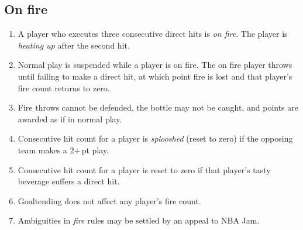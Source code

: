 \documentclass[11pt,letterpaper,twocolumn,english,DIV=calc]{scrartcl}
\begin{document}
\subsection{On fire}
\begin{enumerate}[leftmargin=2.8em, label=\thesubsection.\arabic*]
	\item \label{enu:fire_count} A player who executes three consecutive direct hits is \emph{on fire}.
	The player is \emph{heating up} after the second hit.
	\item Normal play is suspended while a player is on fire. 
	The on fire player throws until failing to make a direct hit, at which point fire is lost and that player's fire count returns to zero.
	\item Fire throws cannot be defended, the bottle may not be caught, and points are awarded as if in normal play.
	\item \label{enu:splooshing_1} Consecutive hit count for a player is \emph{splooshed} (reset to zero) if the opposing team makes a 2+\,pt play.
	\item Consecutive hit count for a player is reset to zero if that player's tasty beverage suffers a direct hit.
	\item Goaltending does not affect any player's fire count.
	\item Ambiguities in \emph{fire} rules may be settled by an appeal to NBA Jam.
\end{enumerate}
\end{document}
